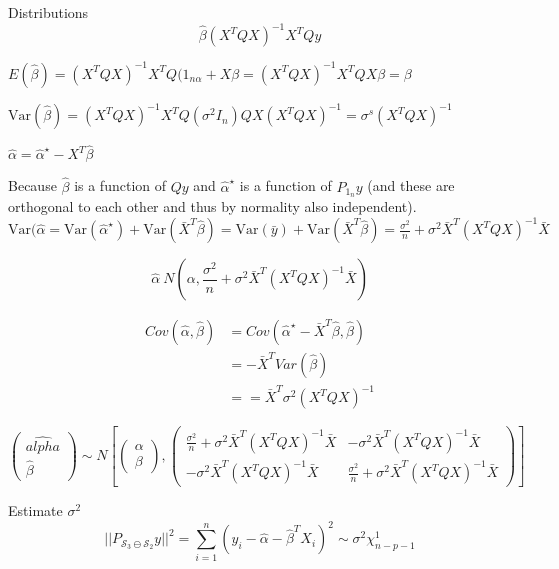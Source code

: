 \documentclass[11pt,fleqn]{book} %
\begin{document}
Distributions\\

$$\hat{\beta} (X^TQX)^{-1}X^TQy$$

$E(\hat{\beta}) = (X^TQX)^{-1}X^TQ(1_{n\alpha} + X\beta = (X^TQX)^{-1}X^TQX \beta = \beta$

$\text{Var}(\hat{\beta}) =  (X^TQX)^{-1}X^TQ (\sigma^2 I_n) QX (X^TQX)^{-1} = \sigma^s(X^TQX)^{-1} $

$\hat{\alpha} = \hat{\alpha}^\star - X^T \hat{\beta}$

Because $\hat{\beta}$ is a function of $Qy$ and $\hat{\alpha}^\star$ is a function of $P_{1_n}y$ (and these are orthogonal to each other and thus by normality also independent). \\

$\text{Var}(\hat{\alpha} = \text{Var}(\hat{\alpha}^\star) + \text{Var}( \bar{X}^T \hat{\beta}) = \text{Var}(\bar{y}) + \text{Var}( \bar{X}^T \hat{\beta}) = \frac{\sigma^2}{n} + \sigma^2 \bar{X}^T(X^TQX)^{-1} \bar{X} $

$$\hat{\alpha} ~ N( \alpha, \frac{\sigma^2}{n} + \sigma^2 \bar{X}^T(X^TQX)^{-1} \bar{X}) $$

\begin{align*}
	Cov(\hat{\alpha}, \hat{\beta}) &= Cov(\hat{\alpha}^\star - \bar{X}^T\hat{\beta}, \hat{\beta})\\
		&=-\bar{X}^T Var(\hat{\beta})\\
		&= =\bar{X}^T \sigma^2 (X^TQX)^{-1}
\end{align*}

$$ \begin{pmatrix}
	\hat{alpha}\\
	\hat{\beta}
\end{pmatrix} \sim N[\begin{pmatrix}
	\alpha\\
	\beta
\end{pmatrix}, \begin{pmatrix}
	\frac{\sigma^2}{n} + \sigma^2 \bar{X}^T(X^TQX)^{-1} \bar{X} & - \sigma^2 \bar{X}^T(X^TQX)^{-1} \bar{X}\\
	- \sigma^2 \bar{X}^T(X^TQX)^{-1} \bar{X} & \frac{\sigma^2}{n} + \sigma^2 \bar{X}^T(X^TQX)^{-1} \bar{X}
\end{pmatrix}]$$

Estimate $\sigma^2$\\


$$ ||P_{\mathscr{S}_3 \ominus \mathscr{S}_2}y||^2 = \displaystyle \sum^n_{i=1} (y_i - \hat{\alpha} - \hat{\beta}^TX_i)^2 \sim \sigma^2 \chi^1_{n-p-1}$$
\end{document}
